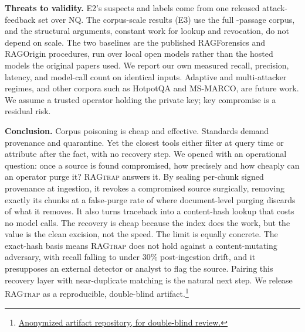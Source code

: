 \documentclass[12pt]{article}
\newcommand{\sysname}{\textsc{RAGtrap}\xspace}
\begin{document}
\textbf{Threats to validity.} E2's suspects and labels come from one released
attack-feedback set over NQ. The corpus-scale results (E3) use the full
\FullPassages{}-passage corpus, and the structural arguments, constant work for
lookup and revocation, do not depend on scale. The two baselines are the
published RAGForensics and RAGOrigin procedures, run over local open models
rather than the hosted models the original papers used. We report our own
measured recall, precision, latency, and model-call count on identical inputs.
Adaptive and multi-attacker regimes, and other corpora such as HotpotQA and
MS-MARCO, are future work. We assume a trusted operator holding the private key;
key compromise is a residual risk.

\textbf{Conclusion.} Corpus poisoning is cheap and effective. Standards demand
provenance and quarantine. Yet the closest tools either filter at query time or
attribute after the fact, with no recovery step. We opened with an operational
question: once a source is found compromised, how precisely and how cheaply can
an operator purge it? \sysname{} answers it. By sealing per-chunk signed
provenance at ingestion, it revokes a compromised source surgically, removing
exactly its chunks at a false-purge rate of \textbf{\PerChunkFP{}} where
document-level purging discards \PerDocFP{} of what it removes. It also turns
traceback into a content-hash lookup that costs no model calls. The recovery is
cheap because the index does the work, but the value is the clean excision, not
the speed. The limit is equally concrete. The exact-hash basis means \sysname{}
does not hold against a content-mutating adversary, with recall falling to
\RTrecallDriftThree{} under 30\% post-ingestion drift, and it presupposes an
external detector or analyst to flag the source. Pairing this recovery layer with
near-duplicate matching is the natural next step. We release \sysname{} as a
reproducible, double-blind
artifact.\footnote{\href{https://anonymous.4open.science}{Anonymized artifact
repository, for double-blind review.}}



\end{document}
